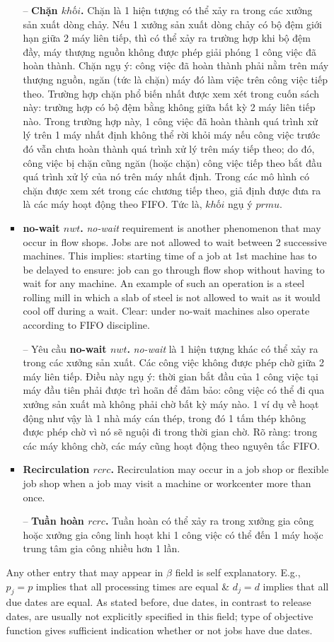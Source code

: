\documentclass{article}
\begin{document}
\begin{itemize}
\begin{itemize}
\begin{itemize}
            -- {\bf Chặn $khối$.} Chặn là 1 hiện tượng có thể xảy ra trong các xưởng sản xuất dòng chảy. Nếu 1 xưởng sản xuất dòng chảy có bộ đệm giới hạn giữa 2 máy liên tiếp, thì có thể xảy ra trường hợp khi bộ đệm đầy, máy thượng nguồn không được phép giải phóng 1 công việc đã hoàn thành. Chặn ngụ ý: công việc đã hoàn thành phải nằm trên máy thượng nguồn, ngăn (tức là chặn) máy đó làm việc trên công việc tiếp theo. Trường hợp chặn phổ biến nhất được xem xét trong cuốn sách này: trường hợp có bộ đệm bằng không giữa bất kỳ 2 máy liên tiếp nào. Trong trường hợp này, 1 công việc đã hoàn thành quá trình xử lý trên 1 máy nhất định không thể rời khỏi máy nếu công việc trước đó vẫn chưa hoàn thành quá trình xử lý trên máy tiếp theo; do đó, công việc bị chặn cũng ngăn (hoặc chặn) công việc tiếp theo bắt đầu quá trình xử lý của nó trên máy nhất định. Trong các mô hình có chặn được xem xét trong các chương tiếp theo, giả định được đưa ra là các máy hoạt động theo FIFO. Tức là, $khối$ ngụ ý $prmu$.
            \item {\bf no-wait $nwt$.} {\it no-wait} requirement is another phenomenon that may occur in flow shops. Jobs are not allowed to wait between 2 successive machines. This implies: starting time of a job at 1st machine has to be delayed to ensure: job can go through flow shop without having to wait for any machine. An example of such an operation is a steel rolling mill in which a slab of steel is not allowed to wait as it would cool off during a wait. Clear: under no-wait machines also operate according to FIFO discipline.

            -- Yêu cầu {\bf no-wait $nwt$.} {\it no-wait} là 1 hiện tượng khác có thể xảy ra trong các xưởng sản xuất. Các công việc không được phép chờ giữa 2 máy liên tiếp. Điều này ngụ ý: thời gian bắt đầu của 1 công việc tại máy đầu tiên phải được trì hoãn để đảm bảo: công việc có thể đi qua xưởng sản xuất mà không phải chờ bất kỳ máy nào. 1 ví dụ về hoạt động như vậy là 1 nhà máy cán thép, trong đó 1 tấm thép không được phép chờ vì nó sẽ nguội đi trong thời gian chờ. Rõ ràng: trong các máy không chờ, các máy cũng hoạt động theo nguyên tắc FIFO.
            \item {\bf Recirculation $rcrc$.} Recirculation may occur in a job shop or flexible job shop when a job may visit a machine or workcenter more than once.

            -- {\bf Tuần hoàn $rcrc$.} Tuần hoàn có thể xảy ra trong xưởng gia công hoặc xưởng gia công linh hoạt khi 1 công việc có thể đến 1 máy hoặc trung tâm gia công nhiều hơn 1 lần.
        \end{itemize}
        Any other entry that may appear in $\beta$ field is self explanatory. E.g., $p_j = p$ implies that all processing times are equal \& $d_j = d$ implies that all due dates are equal. As stated before, due dates, in contrast to release dates, are usually not explicitly specified in this field; type of objective function gives sufficient indication whether or not jobs have due dates.


\end{itemize}
\end{itemize}
\end{document}
